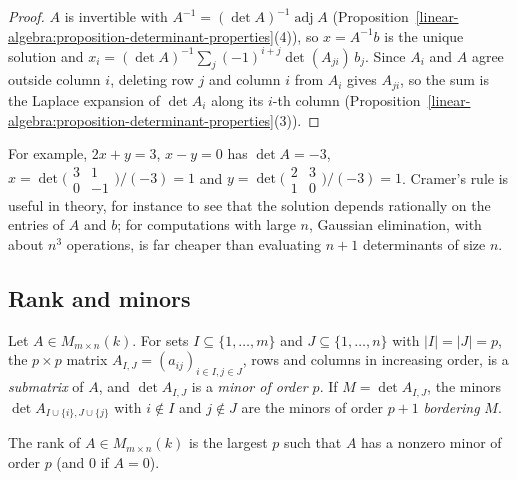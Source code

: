 \begin{proof}
$A$ is invertible with $A^{-1} = (\det A)^{-1}\operatorname{adj}A$ (Proposition~\ref{linear-algebra:proposition-determinant-properties}(4)), so $x = A^{-1}b$ is the unique solution and
$x_i = (\det A)^{-1}\sum_j(-1)^{i+j}\det(A_{ji})\,b_j$. Since $A_i$ and $A$ agree outside column $i$, deleting row $j$ and column $i$ from $A_i$ gives $A_{ji}$, so the sum is the Laplace expansion of
$\det A_i$ along its $i$-th column (Proposition~\ref{linear-algebra:proposition-determinant-properties}(3)).
\end{proof}

For example, $2x + y = 3$, $x - y = 0$ has $\det A = -3$, $x = \det\bigl(\begin{smallmatrix}3 & 1\\ 0 & -1\end{smallmatrix}\bigr)/(-3) = 1$ and
$y = \det\bigl(\begin{smallmatrix}2 & 3\\ 1 & 0\end{smallmatrix}\bigr)/(-3) = 1$. Cramer's rule is useful in theory, for instance to see that the solution depends rationally on the entries of $A$ and $b$; for
computations with large $n$, Gaussian elimination, with about $n^3$ operations, is far cheaper than evaluating $n + 1$ determinants of size $n$.

\subsection{Rank and minors}\label{linear-algebra:subsection-minors}

\begin{definition}\label{linear-algebra:definition-minor}
Let $A \in M_{m \times n}(k)$. For sets $I \subseteq \{1, \ldots, m\}$ and $J \subseteq \{1, \ldots, n\}$ with $|I| = |J| = p$, the $p \times p$ matrix $A_{I,J} = (a_{ij})_{i \in I, j \in J}$, rows and columns in
increasing order, is a \emph{submatrix} of $A$, and $\det A_{I,J}$ is a \emph{minor of order $p$}. If $M = \det A_{I,J}$, the minors $\det A_{I \cup \{i\}, J \cup \{j\}}$ with $i \notin I$ and
$j \notin J$ are the minors of order $p + 1$ \emph{bordering} $M$.
\end{definition}

\begin{proposition}\label{linear-algebra:proposition-rank-minors}
The rank of $A \in M_{m \times n}(k)$ is the largest $p$ such that $A$ has a nonzero minor of order $p$ (and $0$ if $A = 0$).
\end{proposition}


